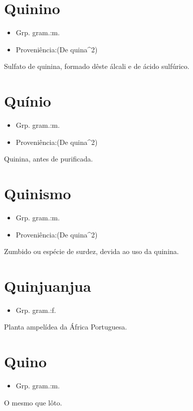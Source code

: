 \section{Quinino}
\begin{itemize}
\item {Grp. gram.:m.}
\end{itemize}
\begin{itemize}
\item {Proveniência:(De \textunderscore quina\textunderscore ^2)}
\end{itemize}
Sulfato de quinina, formado dêste álcali e de ácido sulfúrico.
\section{Quínio}
\begin{itemize}
\item {Grp. gram.:m.}
\end{itemize}
\begin{itemize}
\item {Proveniência:(De \textunderscore quina\textunderscore ^2)}
\end{itemize}
Quinina, antes de purificada.
\section{Quinismo}
\begin{itemize}
\item {Grp. gram.:m.}
\end{itemize}
\begin{itemize}
\item {Proveniência:(De \textunderscore quina\textunderscore ^2)}
\end{itemize}
Zumbido ou espécie de surdez, devida ao uso da quinina.
\section{Quinjuanjua}
\begin{itemize}
\item {Grp. gram.:f.}
\end{itemize}
Planta ampelídea da África Portuguesa.
\section{Quino}
\begin{itemize}
\item {Grp. gram.:m.}
\end{itemize}
O mesmo que \textunderscore lôto\textunderscore .
